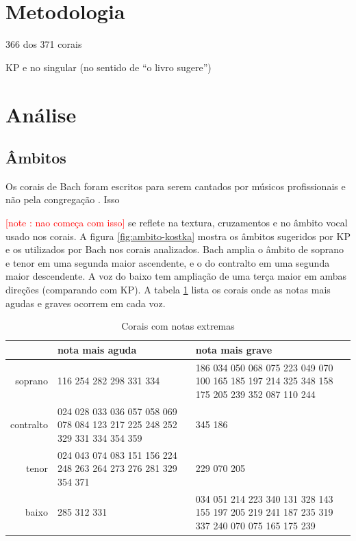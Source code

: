 \documentclass{article}
\newcounter{notecounter}
\newcommand{\note}[1]{
  \addtocounter{notecounter}{1}
  \textcolor{red}{[note \arabic{notecounter}: #1]}
}
\begin{document}
\section{Metodologia}
\label{sec:metodologia}

366 dos 371 corais

KP e no singular (no sentido de ``o livro sugere'')

\section{Análise}
\label{sec:analise}

\subsection{Âmbitos}
\label{sec:ambitos}

Os corais de Bach foram escritos para serem cantados por músicos
profissionais e não pela congregação \cite{bach41:371}. Isso \note{nao
  começa com isso} se reflete na textura, cruzamentos e no âmbito
vocal usado nos corais. A figura \ref{fig:ambito-kostka} mostra os
âmbitos sugeridos por KP e os utilizados por Bach nos corais
analizados. Bach amplia o âmbito de soprano e tenor em uma segunda
maior ascendente, e o do contralto em uma segunda maior descendente. A
voz do baixo tem ampliação de uma terça maior em ambas direções
(comparando com KP). A tabela \ref{tab:notas-extremas} lista os corais
onde as notas mais agudas e graves ocorrem em cada voz.

\begin{table}[t]
\begin{center}
\begin{small}
\begin{sc}
  \begin{tabular}{r|p{4cm}p{4cm}}
    & nota mais aguda & nota mais grave \\ 
    \hline
    soprano &  116 254 282 298 331 334 &  186 034 050 068 075 223 049 070 100 165 185 197 214 325 348 158 175
    205 239 352 087 110 244 \\ \aroundspace
    contralto & 024 028 033 036 057 058 069 078 084 123 217 225 248 252 329 331 334
    354 359 &   345 186 \\ \aroundspace
    tenor &   024 043 074 083 151 156 224 248 263 264 273 276 281 329
    354 371 &   229 070 205 \\ \aroundspace
    baixo &   285 312 331 &   034 051 214 223 340 131 328 143 155 197 205 219 241 187 235 319 337
    240 070 075 165 175 239 
  \end{tabular}
  \caption{Corais com notas extremas}
  \label{tab:notas-extremas}
\end{sc}
\end{small}
\end{center}
\end{table}
\end{document}
